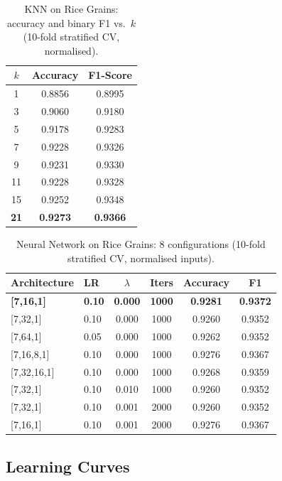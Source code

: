 \documentclass[11pt,letterpaper]{article}
\begin{document}
\begin{table}[H]
\centering
\caption{KNN on Rice Grains: accuracy and binary F1 vs.\ $k$
         (10-fold stratified CV, normalised).}
\label{tab:d3_knn}
\begin{tabular}{@{}ccc@{}}
\toprule
$k$ & Accuracy & F1-Score \\
\midrule
1  & 0.8856 & 0.8995 \\
3  & 0.9060 & 0.9180 \\
5  & 0.9178 & 0.9283 \\
7  & 0.9228 & 0.9326 \\
9  & 0.9231 & 0.9330 \\
11 & 0.9228 & 0.9328 \\
15 & 0.9252 & 0.9348 \\
\rowcolor{hilight}
\textbf{21} & \textbf{0.9273} & \textbf{0.9366} \\
\bottomrule
\end{tabular}
\end{table}

\begin{table}[ht]
\centering
\caption{Neural Network on Rice Grains: 8 configurations
         (10-fold stratified CV, normalised inputs).}
\label{tab:d3_nn}
\begin{tabular}{@{}llcccc@{}}
\toprule
Architecture & LR & $\lambda$ & Iters & Accuracy & F1 \\
\midrule
\rowcolor{hilight}
\textbf{[7,16,1]} & \textbf{0.10} & \textbf{0.000}
  & \textbf{1000} & \textbf{0.9281} & \textbf{0.9372} \\
{[7,32,1]}    & 0.10 & 0.000 & 1000 & 0.9260 & 0.9352 \\
{[7,64,1]}    & 0.05 & 0.000 & 1000 & 0.9262 & 0.9352 \\
{[7,16,8,1]}  & 0.10 & 0.000 & 1000 & 0.9276 & 0.9367 \\
{[7,32,16,1]} & 0.10 & 0.000 & 1000 & 0.9268 & 0.9359 \\
{[7,32,1]}    & 0.10 & 0.010 & 1000 & 0.9260 & 0.9352 \\
{[7,32,1]}    & 0.10 & 0.001 & 2000 & 0.9260 & 0.9352 \\
{[7,16,1]}    & 0.10 & 0.001 & 2000 & 0.9276 & 0.9367 \\
\bottomrule
\end{tabular}
\end{table}

\subsection{Learning Curves}
\end{document}
